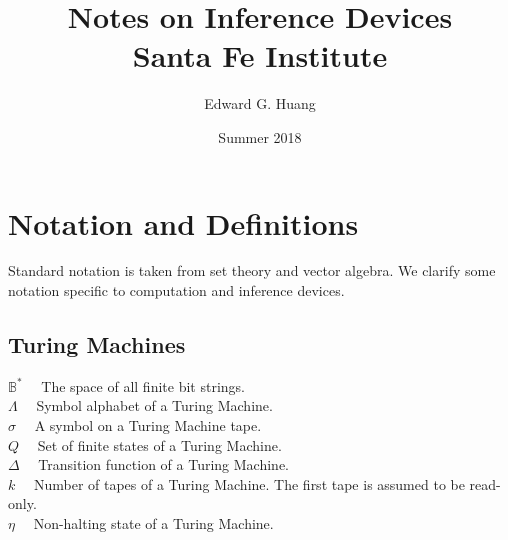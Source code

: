 \documentclass[11pt]{article}
\title{
  Notes on Inference Devices \\
  \large Santa Fe Institute}
\author{Edward G. Huang}
\date{Summer 2018}
\newcommand{\B}{\mathbb{B}}
\begin{document}
\maketitle 

\section{Notation and Definitions} 

Standard notation is taken from set theory and vector algebra. We clarify some notation specific to computation and inference devices. \\


\subsection{Turing Machines} 

$ \B^{*} \quad $ The space of all finite bit strings. \\
$ \Lambda \quad $ Symbol alphabet of a Turing Machine. \\
$ \sigma \quad $ A symbol on a Turing Machine tape. \\
$ Q \quad $ Set of finite states of a Turing Machine. \\
$ \Delta \quad $ Transition function of a Turing Machine. \\
$ k \quad $ Number of tapes of a Turing Machine. The first tape is assumed to be read-only. \\
$ \eta \quad $ Non-halting state of a Turing Machine. \\
\end{document}

